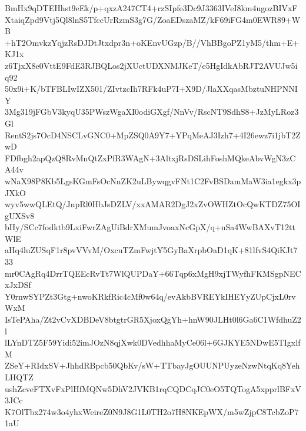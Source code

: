 BmHx9qDTEHhst9eEk/p+qxzA247CT4+rzSIpfe3Dc9J3363IVeI8km4ugozBIVxF
XtaiqZpd9Vtj5Ql8lnS5TfccUrRzmS3g7G/ZoaEDszaMZ/kF69iFG4m0EWR89+WB
+hT2OmvkzYqjzRsDJDtJtxdpr3n+oKEnvUGzp/B//VhBBgoPZ1yM5/thm+E+KJ1x
z6TjxX8e0VttE9FdE3RJBQLos2jXUctUDXNMJKeT/e5HgIdkAbRJT2AVUJw5iq92
50x9i+K/bTFBLIwIZX501/ZIvtzcIh7RFk4uP7I+X9D/JlaXXqasMbztuNHPNNIY
3Mg319jFGbV3kyqU35PWszWgaXI0odiGXgf/NnVv/RscNT9SdhS8+JzMyLRoz3Gl
RentS2js7OcD4NSCLvGNC0+MpZSQ0A9Y7+YPqMeAJ3Izh7+4I26ewz7i1jbT2ZwD
FDfbgh2apQzQ8RvMnQtZxPfR3WAgN+3AltxjRsDSLihFoshMQkeAbvWgN3zCA44v
wNaX98P8Kb5LgsKGmFsOcNnZK2uLBywqgvFNt1C2FvBSDamMaW3ia1egkx3pJXkO
wyv5wwQLEtQ/JnpRl0HbJsDZLV/xxAMAR2DgJ2xZvOWHZtOcQwKTDZ75OIgUXSv8
bHy/SCc7fodktb9LxiFwrZAgUiBdrXMumJvoaxNcGpX/q+nSa4WwBAXvT12ttWlE
aHq4luZUSqF1r8pvVVvM/OxcuTZmFwjtY5GyBaXrpbOaD1qK+81lfvS4QiKJt733
mr0CAgRq4DrrTQEEcRvTt7WlQUPDaY+66Tqp6xMgH9xjTWyfhFKMSgpNECxJxDSf
Y0rnwSYPZt3Gtg+nwoKRkfRic4cMf0w64q/evAkbBVREYkIHEYyZUpCjxL0rvWxM
IsTePAha/Zt2vCvXDBDeV8btgtrGR5XjoxQgYh+hnW90JLHt0l6Ga6C1WfdhuZ2l
lLYnDTZ5F59Yidi52imJOzN8qjXwk0DVedhhaMyCe06l+6GJKYE5NDwE5TIgxlfM
ZSeY+RIdxSV+JhhdRBpcb50QbKv/sW+TTbayJgOUUNPUyzeNzwNtqKq8YehLHQTZ
ushZcveFTXvFxPlHfMQNw5DhV2JVKB1rqCQDCqJC0eO5TQTogA5xpprlBFxV3JCc
K7OlTbx274w3o4yhxWeireZ0N9J8G1L0TH2o7H8NKEpWX/m5wZjpC8TcbZoP71aU
